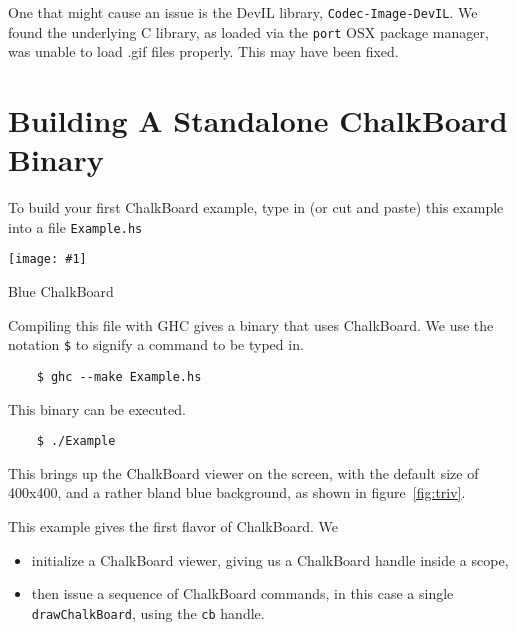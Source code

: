 \documentclass{article}
\newcommand{\floatimg}[3]{%
\begin{floatingfigure}[r]{0.35\textwidth} 
\texttt{[image: \#1]}
\caption{#2}\label{#3}
\end{floatingfigure}}
\begin{document}
One that might cause an issue is the DevIL library,
\verb|Codec-Image-DevIL|. We found the underlying C library, as
loaded via the \verb|port| OSX package manager, was unable to load
.gif files properly. This may have been fixed.

\newpage
\section{Building A Standalone ChalkBoard Binary}

To build your first ChalkBoard example, type in (or cut and paste) this example
into a file \verb|Example.hs|


\floatimg{ex1.png}{Blue ChalkBoard}{fig:triv}%
Compiling this file with GHC gives a binary that uses ChalkBoard. We use the notation \verb|$|
to signify a command to be typed in.

\begin{minipage}{0.60\linewidth}
\begin{verbatim}
    $ ghc --make Example.hs
\end{verbatim}
This binary can be executed.
\begin{verbatim}
    $ ./Example
\end{verbatim}
\end{minipage}

This brings up the ChalkBoard viewer on the screen, with the default size of 400x400,
and a rather bland blue background, as shown in figure~\ref{fig:triv}.

This example gives the first flavor of ChalkBoard. We

\vspace{0.2in}
\begin{minipage}{1\linewidth}
\begin{itemize}
\item initialize a ChalkBoard viewer, giving us a ChalkBoard handle inside a scope,
\item then issue a sequence of ChalkBoard commands, in this case a single 
\verb|drawChalkBoard|, using the \verb|cb| handle.
\end{itemize}
\end{minipage}
\vspace{0.2in}
\end{document}
